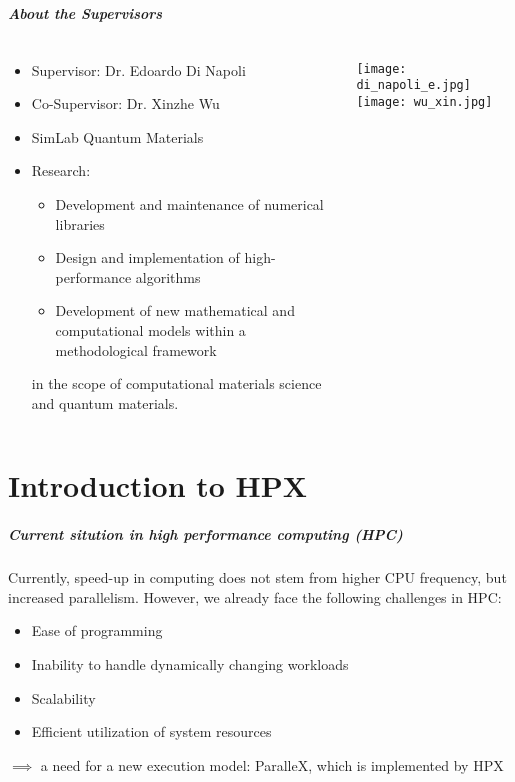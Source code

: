 \begin{frame}
\frametitle{About the Supervisors}
\begin{columns}[T]
 \begin{column}{.5\textwidth}
  \begin{itemize}
  \item Supervisor: Dr. Edoardo Di Napoli
  \item Co-Supervisor: Dr. Xinzhe Wu
  \item SimLab Quantum Materials
  \item Research:
    \begin{itemize}
    \item Development and maintenance of numerical libraries
    \item Design and implementation of high-performance algorithms
    \item Development of new mathematical and computational models within a methodological framework
    \end{itemize}
    in the scope of computational materials science and quantum materials.
  \end{itemize}
 \end{column}
 \begin{column}{.5\textwidth}
 \begin{center}
  \texttt{[image: di\_napoli\_e.jpg]}\texttt{[image: wu\_xin.jpg]}
 \end{center}
 \end{column}
\end{columns}


\end{frame}

\part{Introduction to HPX}
\makepart

\begin{frame}
\frametitle{Current sitution in high performance computing (HPC)}
Currently, speed-up in computing does not stem from higher CPU frequency, but increased parallelism.
However, we already face the following challenges in HPC:
\begin{itemize}
  \item Ease of programming
  \item Inability to handle dynamically changing workloads
  \item Scalability
  \item Efficient utilization of system resources
\end{itemize}
\(\implies\) a need for a new execution model: ParalleX, which is implemented by HPX
\end{frame}

